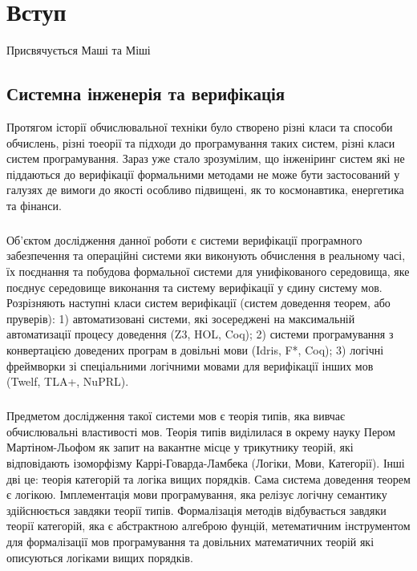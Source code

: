 \chapter{Вступ}

\epigraph{Присвячується Маші та Міші}{}

\section{Системна інженерія та верифікація}
Протягом історії обчислювальної техніки було створено різні класи та способи обчислень,
різні тоеорії та підходи до програмування таких систем, різні класи систем програмування.
Зараз уже стало зрозумілим, що інженіринг систем які не піддаються до верифікації
формальними методами не може бути застосований у галузях де вимоги до якості
особливо підвищені, як то космонавтика, енергетика та фінанси.

\paragraph{}
Об'єктом дослідження данної роботи є системи верифікації програмного забезпечення
та операційні системи яки виконують
обчислення в реальному часі, їх поєднання та побудова формальної системи для
унифікованого середовища, яке поєднує середовище виконання та систему верифікації у єдину систему мов.
Розрізняють наступні класи систем верифікації (систем доведення теорем, або пруверів):
1) автоматизовані системи, які зосереджені на максимальній автоматизації процесу доведення (Z3, HOL, Coq);
2) системи програмування з конвертацією доведених програм в довільні мови (Idris, F*, Coq);
3) логічні фреймворки зі спеціальними логічними мовами для верифікації інших мов (Twelf, TLA+, NuPRL).

\paragraph{}
Предметом дослідження такої системи мов є теорія типів, яка вивчає обчислювальні властивості мов.
Теорія типів виділилася в окрему науку Пером Мартіном-Льофом як запит на вакантне місце у
трикутнику теорій, які відповідають ізоморфізму Каррі-Говарда-Ламбека (Логіки, Мови, Категорії).
Інші дві це: теорія категорій та логіка вищих порядків. Сама система доведення теорем є
логікою. Імплементація мови програмування,
яка релізує логічну семантику здійснюється завдяки теорії типів. Формалізація методів
відбувається завдяки теорії категорій, яка є абстрактною алгеброю фунцій,
метематичним інструментом для формалізації мов програмування та довільних
математичних теорій які описуються логіками вищих порядків.


